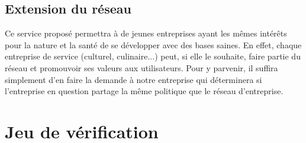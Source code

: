 {

\section{Extension du réseau}

Ce service proposé permettra à de jeunes entreprises ayant les mêmes intérêts pour la nature et la santé de se développer avec des bases saines.
En effet, chaque entreprise de service (culturel, culinaire...) peut, si elle le souhaite, faire partie du réseau et promouvoir ses valeurs aux utilisateurs. \n
Pour y parvenir, il suffira simplement d'en faire la demande à notre entreprise qui déterminera si l'entreprise en question partage la même politique que le réseau d'entreprise.\chapter{Jeu de vérification}



}
